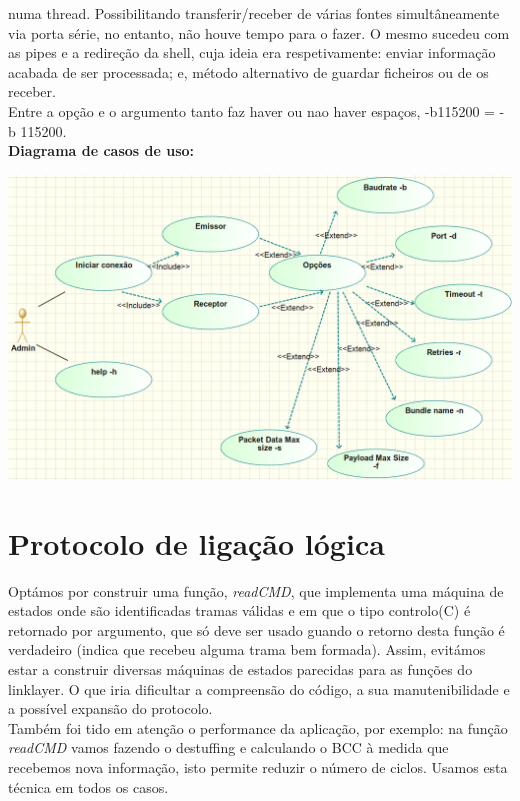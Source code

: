 \documentclass[a4paper]{article}
\begin{document}
numa thread. Possibilitando transferir/receber de várias fontes simultâneamente
via porta série, no entanto, não houve tempo para o fazer. O mesmo sucedeu com
as pipes e a redireção da shell, cuja ideia era respetivamente: enviar
informação acabada de ser processada; e, método alternativo de guardar
ficheiros ou de os receber.\\Entre a opção e o argumento tanto faz haver ou nao
haver espaços, -b115200 = -b 115200.
\\\newline\textbf{Diagrama de casos de uso:}\\\newline
\centerline{\includegraphics[scale=0.45]{useCases.png}}

\section{Protocolo de ligação lógica}
Optámos por construir uma função, \textit{readCMD}, que implementa uma máquina de estados onde são
identificadas tramas válidas e em que o tipo controlo(C) é retornado por
argumento, que só deve ser usado guando o retorno desta função é verdadeiro
(indica que recebeu alguma trama bem formada). Assim, evitámos estar a
construir diversas máquinas de estados parecidas para as funções do linklayer.
O que iria dificultar a compreensão do código, a sua manutenibilidade e a
possível expansão do protocolo.\\\newline
Também foi tido em atenção o performance da aplicação, por exemplo: na função
\textit{readCMD} vamos fazendo o destuffing e calculando o BCC à medida que recebemos
nova informação, isto permite reduzir o número de ciclos. Usamos esta técnica
em todos os casos.
\end{document}

